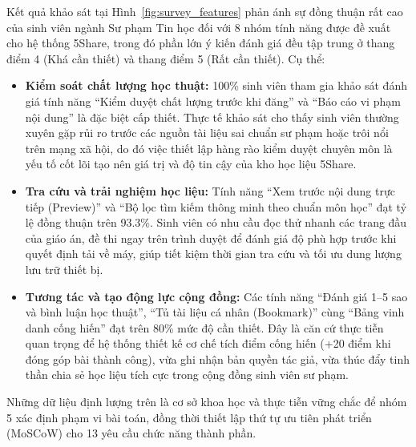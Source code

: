 Kết quả khảo sát tại Hình~\ref{fig:survey_features} phản ánh sự đồng thuận rất cao của sinh viên ngành Sư phạm Tin học đối với 8 nhóm tính năng được đề xuất cho hệ thống 5Share, trong đó phần lớn ý kiến đánh giá đều tập trung ở thang điểm 4 (Khá cần thiết) và thang điểm 5 (Rất cần thiết). Cụ thể:
\begin{itemize}
    \item \textbf{Kiểm soát chất lượng học thuật:} 100\% sinh viên tham gia khảo sát đánh giá tính năng ``Kiểm duyệt chất lượng trước khi đăng'' và ``Báo cáo vi phạm nội dung'' là đặc biệt cấp thiết. Thực tế khảo sát cho thấy sinh viên thường xuyên gặp rủi ro trước các nguồn tài liệu sai chuẩn sư phạm hoặc trôi nổi trên mạng xã hội, do đó việc thiết lập hàng rào kiểm duyệt chuyên môn là yếu tố cốt lõi tạo nên giá trị và độ tin cậy của kho học liệu 5Share.
    \item \textbf{Tra cứu và trải nghiệm học liệu:} Tính năng ``Xem trước nội dung trực tiếp (Preview)'' và ``Bộ lọc tìm kiếm thông minh theo chuẩn môn học'' đạt tỷ lệ đồng thuận trên 93.3\%. Sinh viên có nhu cầu đọc thử nhanh các trang đầu của giáo án, đề thi ngay trên trình duyệt để đánh giá độ phù hợp trước khi quyết định tải về máy, giúp tiết kiệm thời gian tra cứu và tối ưu dung lượng lưu trữ thiết bị.
    \item \textbf{Tương tác và tạo động lực cộng đồng:} Các tính năng ``Đánh giá 1--5 sao và bình luận học thuật'', ``Tủ tài liệu cá nhân (Bookmark)'' cùng ``Bảng vinh danh cống hiến'' đạt trên 80\% mức độ cần thiết. Đây là căn cứ thực tiễn quan trọng để hệ thống thiết kế cơ chế tích điểm cống hiến (+20 điểm khi đóng góp bài thành công), vừa ghi nhận bản quyền tác giả, vừa thúc đẩy tinh thần chia sẻ học liệu tích cực trong cộng đồng sinh viên sư phạm.
\end{itemize}

Những dữ liệu định lượng trên là cơ sở khoa học và thực tiễn vững chắc để nhóm 5 xác định phạm vi bài toán, đồng thời thiết lập thứ tự ưu tiên phát triển (MoSCoW) cho 13 yêu cầu chức năng thành phần.

